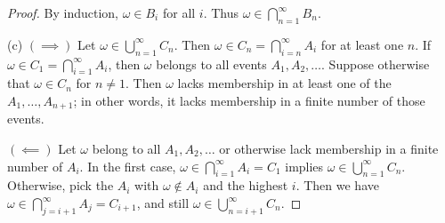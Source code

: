 \documentclass[a4paper]{article}
\begin{document}
\begin{proof}[Proof]
By induction, \(\omega \in B_{i}\) for all \(i\). Thus \(\omega \in \bigcap_{n=1}^{\infty} B_{n} \). 
\vspace{12pt}
\par (c) \(( \implies ) \) Let \(\omega \in \bigcup_{n=1}^{\infty} C_{n} \). Then \(\omega \in C_{n} = \bigcap_{i=n}^{\infty} A_{i} \) for at least one \(n\). If \(\omega \in C_{1} = \bigcap_{i=1}^{\infty} A_{i} \), then \(\omega\) belongs to all events \(A_{1}, A_{2},\dots\). Suppose otherwise that \(\omega \in  C_{n}\) for \(n \neq 1 \). Then \(\omega\) lacks membership in at least one of the \(A_{1},\dots, A_{n+1}\); in other words, it lacks membership in a finite number of those events.

\(( \impliedby )\) Let \(\omega\) belong to all \(A_{1}, A_{2}, \dots\) or otherwise lack membership in a finite number of \(A_{i}\). In the first case, \(\omega \in \bigcap_{i=1}^{\infty} A_{i} = C_{1} \) implies \(\omega \in \bigcup_{n=1}^{\infty} C_{n} \). Otherwise, pick the \(A_{i}\) with \(\omega \not\in A_{i}\) and the highest \(i\). Then we have \(\omega \in \bigcap_{j = i+1}^{\infty} A_{j} = C_{i+1} \), and still \(\omega \in \bigcup_{n = i+1}^{\infty} C_{n} \).
\end{proof}

\end{document}
